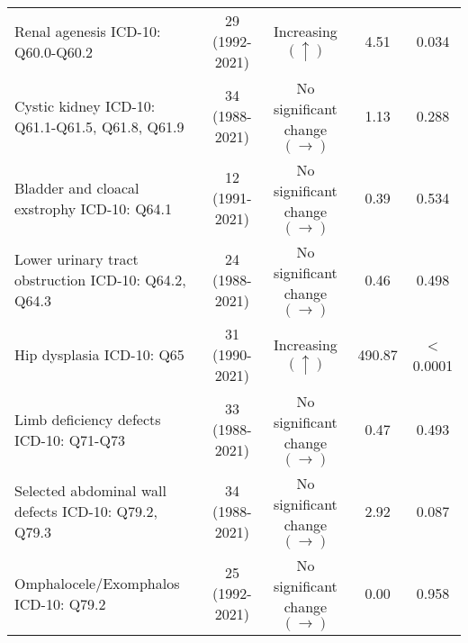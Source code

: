 \documentclass[
]{krantz}
\begin{document}
\begin{longtable}[t]{>{\raggedright\arraybackslash}p{4cm}cccc}
\addlinespace
Renal agenesis\newline  \tiny{ ICD-10: Q60.0-Q60.2} & \makecell[c]{29\\ \tiny{(1992-2021)}} & Increasing $\left(\uparrow \right)$ & 4.51 & 0.034\\
Cystic kidney\newline  \tiny{ ICD-10: Q61.1-Q61.5, Q61.8, Q61.9} & \makecell[c]{34\\ \tiny{(1988-2021)}} & \makecell[c]{No significant \\ change $\left(\rightarrow \right)$} & 1.13 & 0.288\\
Bladder and cloacal exstrophy\newline  \tiny{ ICD-10: Q64.1} & \makecell[c]{12\\ \tiny{(1991-2021)}} & \makecell[c]{No significant \\ change $\left(\rightarrow \right)$} & 0.39 & 0.534\\
Lower urinary tract obstruction\newline  \tiny{ ICD-10: Q64.2, Q64.3} & \makecell[c]{24\\ \tiny{(1988-2021)}} & \makecell[c]{No significant \\ change $\left(\rightarrow \right)$} & 0.46 & 0.498\\
Hip dysplasia\newline  \tiny{ ICD-10: Q65} & \makecell[c]{31\\ \tiny{(1990-2021)}} & Increasing $\left(\uparrow \right)$ & 490.87 & < 0.0001\\
\addlinespace
Limb deficiency defects\newline  \tiny{ ICD-10: Q71-Q73} & \makecell[c]{33\\ \tiny{(1988-2021)}} & \makecell[c]{No significant \\ change $\left(\rightarrow \right)$} & 0.47 & 0.493\\
Selected abdominal wall defects\newline  \tiny{ ICD-10: Q79.2, Q79.3} & \makecell[c]{34\\ \tiny{(1988-2021)}} & \makecell[c]{No significant \\ change $\left(\rightarrow \right)$} & 2.92 & 0.087\\
Omphalocele/Exomphalos\newline  \tiny{ ICD-10: Q79.2} & \makecell[c]{25\\ \tiny{(1992-2021)}} & \makecell[c]{No significant \\ change $\left(\rightarrow \right)$} & 0.00 & 0.958\\

\end{longtable}
\end{document}
